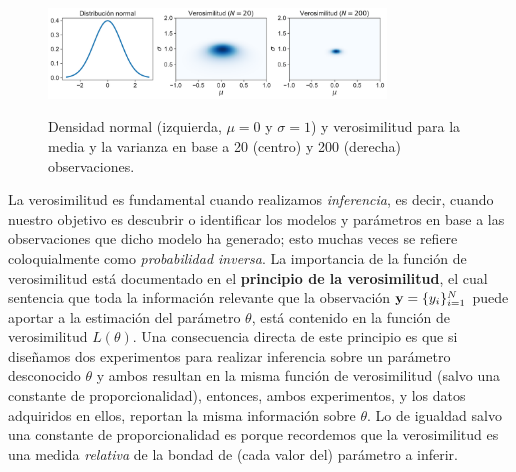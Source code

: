 \begin{mdframed}[style=ejemplo, frametitle={\center Ejemplo: Verosimilitud para el modelo gaussiano  (muestras  independientes)}]
\begin{figure}[H]
	\centering
	\includegraphics[width=0.8\textwidth, frame]{img/cap1_gaussian_likelihood}\\
	\caption{Densidad normal (izquierda, $\mu=0$ y $\sigma=1$) y verosimilitud para la media y la varianza en base a 20 (centro) y 200 (derecha) observaciones.}
	\label{fig:gaussian_likelihood}  
\end{figure}
  


\end{mdframed}

La verosimilitud es fundamental cuando realizamos \emph{inferencia}, es decir, cuando nuestro objetivo es descubrir o identificar los modelos y parámetros en base a las observaciones que dicho modelo ha generado; esto muchas veces se refiere coloquialmente como \emph{probabilidad inversa}. La importancia de la función de verosimilitud está documentado en el \textbf{principio de la verosimilitud}, el cual sentencia que toda la información relevante que la observación $\mathbf{y} = \{y_i\}_{i=1}^N$ puede aportar a la estimación del parámetro $\theta$, está contenido en la función  de verosimilitud $L(\theta)$. Una consecuencia directa de este principio es que si diseñamos dos experimentos para realizar  inferencia  sobre un parámetro desconocido $\theta$ y ambos  resultan en la misma función de verosimilitud  (salvo una constante de proporcionalidad), entonces,  ambos experimentos, y los datos adquiridos en  ellos, reportan la misma  información  sobre $\theta$. Lo de igualdad salvo una constante de proporcionalidad es porque recordemos que la verosimilitud es una medida \emph{relativa} de la bondad de (cada valor del) parámetro a inferir. 

